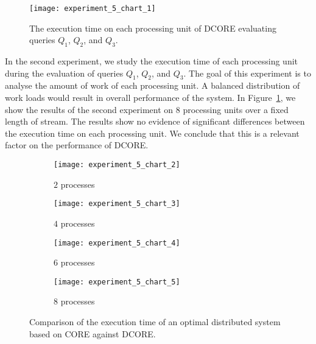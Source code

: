 \begin{figure}[t]
  \centering
  \texttt{[image: experiment\_5\_chart\_1]}
  \caption{The execution time on each processing unit of DCORE evaluating queries $Q_{1}$, $Q_{2}$, and $Q_{3}$.}
  \label{fig:experiment:5}
\end{figure}

In the second experiment, we study the execution time of each processing unit during the evaluation of queries $Q_{1}$, $Q_{2}$, and $Q_{3}$. The goal of this experiment is to analyse the amount of work of each processing unit. A balanced distribution of work loads would result in overall performance of the system. In Figure~\ref{fig:experiment:5}, we show the results of the second experiment on $8$ processing units over a fixed length of stream. The results show no evidence of significant differences between the execution time on each processing unit. We conclude that this is a relevant factor on the performance of DCORE.

\begin{figure}[t]
     \begin{subfigure}[b]{0.49\textwidth}
         \centering
         \texttt{[image: experiment\_5\_chart\_2]}
         \caption{$2$ processes}
         \label{fig:experiment:6:subfigure:1}
     \end{subfigure}
     \begin{subfigure}[b]{0.49\textwidth}
         \centering
         \texttt{[image: experiment\_5\_chart\_3]}
         \caption{$4$ processes}
         \label{fig:experiment:6:subfigure:2}
     \end{subfigure}
     \begin{subfigure}[b]{0.49\textwidth}
         \centering
         \texttt{[image: experiment\_5\_chart\_4]}
         \caption{$6$ processes}
         \label{fig:experiment:6:subfigure:3}
     \end{subfigure}
     \begin{subfigure}[b]{0.49\textwidth}
         \centering
         \texttt{[image: experiment\_5\_chart\_5]}
         \caption{$8$ processes}
         \label{fig:experiment:6:subfigure:4}
     \end{subfigure}
     \caption{Comparison of the execution time of an optimal distributed system based on CORE against DCORE.}
     \label{fig:experiment:6}
\end{figure}

